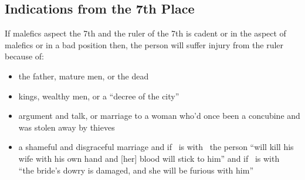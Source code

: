\subsection{Indications from the 7th Place}

If malefics aspect the 7th and the ruler of the 7th is cadent or in the aspect of malefics or in a bad position then, the person will suffer injury from the ruler because of:
\begin{itemize}[topsep=0em,itemsep=0em]
\item[\Saturn] the father, mature men, or the dead
\item[\Jupiter] kings, wealthy men, or a ``decree of the city''
\item[\Mercury] argument and talk, or marriage to a woman who'd once been a concubine and was stolen away by thieves
\item[\Mars] a shameful and disgraceful marriage and if \Mercury\, is with \Mars\, the person ``will kill his wife with his own hand and [her] blood will stick to him'' and if \Mars\, is with \Venus\, ``the bride's dowry is damaged, and she will be furious with him''
\end{itemize}
